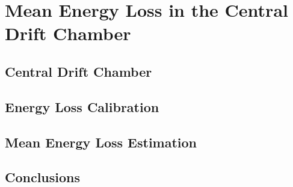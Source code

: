 \section{Mean Energy Loss in the Central Drift Chamber}
\label{p3}

\subsection{Central Drift Chamber}

\subsection{Energy Loss Calibration}

\subsection{Mean Energy Loss Estimation}

\subsection{Conclusions}

